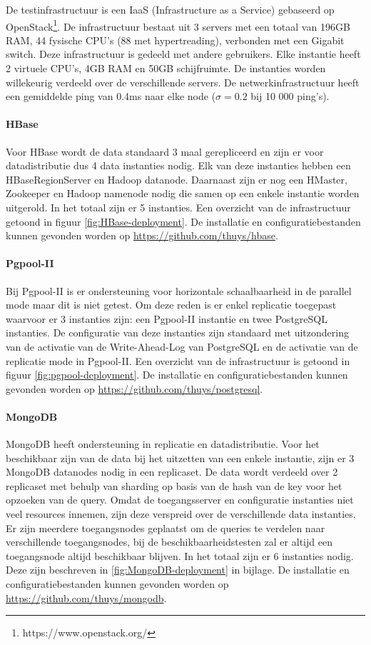 De testinfrastructuur is een IaaS (Infrastructure as a Service) gebaseerd op OpenStack\footnote{https://www.openstack.org/}. De infrastructuur bestaat uit 3 servers met een totaal van 196GB RAM, 44 fysische CPU's (88 met hypertreading), verbonden met een Gigabit switch. Deze infrastructuur is gedeeld met andere gebruikers. Elke instantie heeft 2 virtuele CPU's, 4GB RAM en 50GB schijfruimte. De instanties worden willekeurig verdeeld over de verschillende servers. De netwerkinfrastructuur heeft een gemiddelde ping van 0.4ms naar elke node ($\sigma = 0.2$ bij 10 000 ping's). 

\paragraph{HBase} Voor HBase wordt de data standaard 3 maal gerepliceerd en zijn er voor datadistributie dus 4 data instanties nodig. Elk van deze instanties hebben een HBaseRegionServer en Hadoop datanode. Daarnaast zijn er nog een HMaster, Zookeeper en Hadoop namenode nodig die samen op een enkele instantie worden uitgerold. In het totaal zijn er 5 instanties. Een overzicht van de infrastructuur getoond in figuur \ref{fig:HBase-deployment}. De installatie en configuratiebestanden kunnen gevonden worden op \url{https://github.com/thuys/hbase}. 

\paragraph{Pgpool-II} Bij Pgpool-II is er ondersteuning voor horizontale schaalbaarheid in de parallel mode maar dit is niet getest. Om deze reden is er enkel replicatie toegepast waarvoor er 3 instanties zijn: een Pgpool-II instantie en twee PostgreSQL instanties. De configuratie van deze instanties zijn standaard met uitzondering van de activatie van de Write-Ahead-Log van PostgreSQL en de activatie van de replicatie mode in Pgpool-II. Een overzicht van de infrastructuur is getoond in figuur \ref{fig:pgpool-deployment}. De installatie en configuratiebestanden kunnen gevonden worden op \url{https://github.com/thuys/postgresql}.

\paragraph{MongoDB} MongoDB heeft ondersteuning in replicatie en datadistributie. Voor het beschikbaar zijn van de data bij het uitzetten van een enkele instantie, zijn er 3 MongoDB datanodes nodig in een replicaset. De data wordt verdeeld over 2 replicaset met behulp van sharding op basis van de hash van de key voor het opzoeken van de query. Omdat de toegangsserver en configuratie instanties niet veel resources innemen, zijn deze verspreid over de verschillende data instanties. Er zijn meerdere toegangsnodes geplaatst om de queries te verdelen naar verschillende toegangsnodes, bij de beschikbaarheidstesten zal er altijd een toegangsnode altijd beschikbaar blijven. In het totaal zijn er 6 instanties nodig. Deze zijn beschreven in \ref{fig:MongoDB-deployment} in bijlage. De installatie en configuratiebestanden kunnen gevonden worden op \url{https://github.com/thuys/mongodb}.

